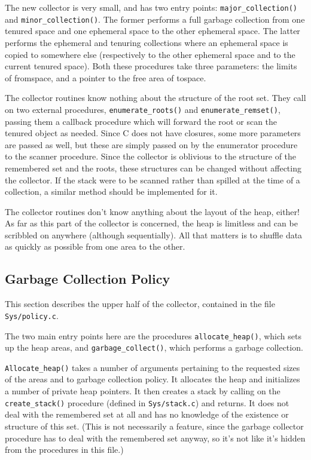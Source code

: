 The new collector is very small, and has two entry points: 
\verb+major_collection()+ and \verb+minor_collection()+. The former performs
a full garbage collection from one tenured space and one ephemeral space to
the other ephemeral space. The latter performs the ephemeral and tenuring
collections where an ephemeral space is copied to somewhere else
(respectively to the other ephemeral space and to the current tenured
space).  Both these procedures take three parameters: the limits of
fromspace, and a pointer to the free area of tospace. 

The collector routines know nothing about the structure of the root set.
They call on two external procedures, \verb+enumerate_roots()+ and
\verb+enumerate_remset()+, passing them a callback procedure which will
forward the root or scan the tenured object as needed. Since C does not
have closures, some more parameters are passed as well, but these are
simply passed on by the enumerator procedure to the scanner procedure.
Since the collector is oblivious to the structure of the remembered set
and the roots, these structures can be changed without affecting the
collector. If the stack were to be scanned rather than spilled at the
time of a collection, a similar method should be implemented for it.

The collector routines don't know anything about the layout of the heap,
either! As far as this part of the collector is concerned, the heap is
limitless and can be scribbled on anywhere (although sequentially). All that
matters is to shuffle data as quickly as possible from one area to the
other.

\subsection{Garbage Collection Policy}

This section describes the upper half of the collector, contained in the
file {\tt Sys/policy.c}.

The two main entry points here are the procedures \verb+allocate_heap()+,
which sets up the heap areas, and \verb+garbage_collect()+, which performs
a garbage collection. 

\verb+Allocate_heap()+ takes a number of arguments pertaining to
the requested sizes of the areas and to garbage collection policy. It
allocates the heap and initializes a number of private heap pointers. It
then creates a stack by calling on the \verb+create_stack()+ procedure
(defined in {\tt Sys/stack.c}) and returns. It does not deal with the
remembered set at all and has no knowledge of the existence or structure
of this set. (This is not necessarily a feature, since the garbage
collector procedure has to deal with the remembered set anyway, so it's
not like it's hidden from the procedures in this file.)

